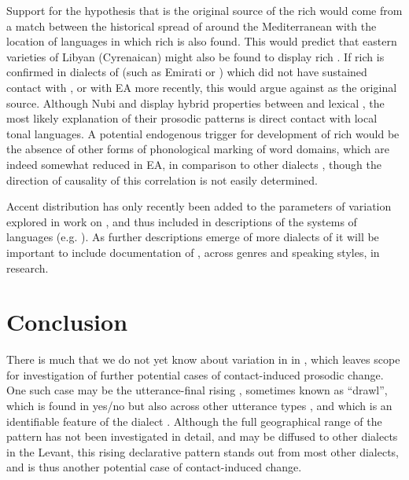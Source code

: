 \documentclass[output=paper]{langsci/langscibook}
\begin{document}
Support for the hypothesis that  is the original source of the rich  would come from a match between the historical spread of   around the Mediterranean with the location of languages in which rich  is also found. This would predict that eastern varieties of Libyan (Cyrenaican)  might also be found to display rich . If rich  is confirmed in dialects of  (such as Emirati or ) which did not have sustained contact with , or with EA more recently, this would argue against  as the original source. Although Nubi \citep{Gussenhoven2006} and   \citep{Nakao2013} display hybrid properties between  and lexical , the most likely explanation of their prosodic patterns is direct contact with local tonal languages. A potential endogenous trigger for development of rich  would be the absence of other forms of phonological marking of word domains, which are indeed somewhat reduced in EA, in comparison to other dialects \citep{Watson2002}, though the direction of causality of this correlation is not easily determined. 

Accent distribution has only recently been added to the parameters of variation explored in work on  \citep{Hellmuth2007}, and thus included in descriptions of the  systems of languages (e.g. \citealt{FrotaPrieto2015}). As further descriptions emerge of more dialects of  it will be important to include documentation of , across genres and speaking styles, in  research.
\largerpage

\section{Conclusion} \label{closes}

There is much that we do not yet know about variation in  in , which leaves scope for investigation of further potential cases of contact-induced prosodic change. One such case may be the   utterance-final rising , sometimes known as ``drawl'', which is found in yes/no  but also across other utterance types \citep{Cowell1964}, and which is an identifiable feature of the  dialect \citep{KulkOdéWoidich2003}. Although the full geographical range of the pattern has not been investigated in detail, and may be diffused to other dialects in the Levant, this rising declarative  pattern stands out from most other  dialects, and is thus another potential case of contact-induced change. 
\end{document}
